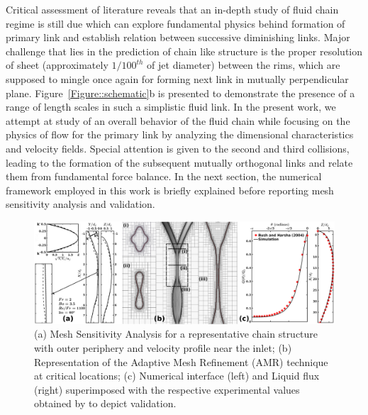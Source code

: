 \documentclass{jfm}
\begin{document}
Critical assessment of literature reveals that an in-depth study of fluid chain regime is still due which can explore fundamental physics behind formation of primary link and establish relation between successive diminishing links. Major challenge that lies in the prediction of chain like structure is the proper resolution of sheet (approximately $1/100^{th}$ of jet diameter) between the rims, which are supposed to mingle once again for forming next link in mutually perpendicular plane. Figure~\ref{Figure::schematic}b is presented to demonstrate the presence of a range of length scales in such a simplistic fluid link. In the present work, we attempt at study of an overall behavior of the fluid chain  while focusing on the physics of flow for the primary link by analyzing the dimensional characteristics and velocity fields. Special attention is given to the second and third collisions, leading to the formation of the subsequent mutually orthogonal links and relate them from fundamental force balance. In the next section, the numerical framework employed in this work is briefly explained before reporting mesh sensitivity analysis and validation.
\begin{figure}
	\centering
	\includegraphics[width=\linewidth]{Figure2}
	\caption{(a) Mesh Sensitivity Analysis for a representative chain structure with outer periphery and velocity profile near the inlet; (b) Representation of the Adaptive Mesh Refinement (AMR) technique at critical locations; (c) Numerical interface (left) and Liquid flux (right) superimposed with the respective experimental values obtained by \cite{bush2004collision} to depict validation.}
	\label{Figure::gisetal}
\end{figure}
\end{document}

